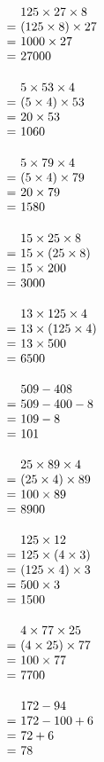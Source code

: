 \documentclass[UTF8]{ctexart}
\makeatletter
\newcommand{\cell}[2]{%
  \begin{minipage}[t][35mm][t]{0.315\textwidth}%
    \vspace{0pt}\linespread{1}#1\selectfont
    \strut#2%
  \end{minipage}%
}
\newcommand{\arow}[3]{%
  \noindent\cell{\zihao{-4}}{#1}\hfill
  \cell{\zihao{-4}}{#2}\hfill
  \cell{\zihao{-4}}{#3}\par\nointerlineskip
}
\newcommand{\eqgap}{0.35em}
\newcommand{\problemline}[1]{#1}
\newcommand{\solution}[1]{%
  \(\begin{array}[t]{@{}r@{\hspace{\eqgap}}l@{}}#1\end{array}\)%
}
\makeatother
\begin{document}
{\solution{
& \problemline{125\times 27\times 8} \\
= & (125\times 8)\times 27 \\
= & 1000\times 27 \\
= & 27000
}}
\arow
{\solution{
& \problemline{5\times 53\times 4} \\
= & (5\times 4)\times 53 \\
= & 20\times 53 \\
= & 1060
}}
{\solution{
& \problemline{5\times 79\times 4} \\
= & (5\times 4)\times 79 \\
= & 20\times 79 \\
= & 1580
}}
{\solution{
& \problemline{15\times 25\times 8} \\
= & 15\times (25\times 8) \\
= & 15\times 200 \\
= & 3000
}}
\arow
{\solution{
& \problemline{13\times 125\times 4} \\
= & 13\times (125\times 4) \\
= & 13\times 500 \\
= & 6500
}}
{\solution{
& \problemline{509-408} \\
= & 509-400-8 \\
= & 109-8 \\
= & 101
}}
{\solution{
& \problemline{25\times 89\times 4} \\
= & (25\times 4)\times 89 \\
= & 100\times 89 \\
= & 8900
}}
\arow
{\solution{
& \problemline{125\times 12} \\
= & 125\times (4\times 3) \\
= & (125\times 4)\times 3 \\
= & 500\times 3 \\
= & 1500
}}
{\solution{
& \problemline{4\times 77\times 25} \\
= & (4\times 25)\times 77 \\
= & 100\times 77 \\
= & 7700
}}
{\solution{
& \problemline{172-94} \\
= & 172-100+6 \\
= & 72+6 \\
= & 78
}}

\newpage
\end{document}
